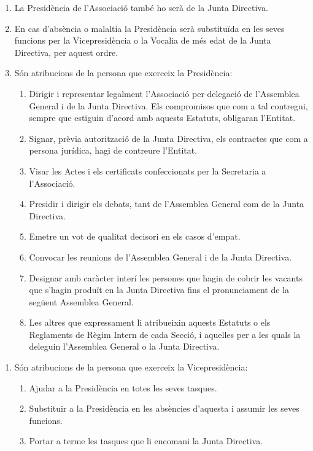 \documentclass[11pt,a4paper]{article}
\newcommand{\JD}{Junta Directiva\xspace}
\newcommand{\AG}{Assemblea General\xspace}
\DeclareRobustCommand{\RRIs}{Reglaments de Règim Intern\xspace}
\begin{document}
\begin{enumerate}
    \item La Presidència de l'Associació també ho serà de la \JD.

    \item En cas d'absència o malaltia la Presidència serà substituïda en les seves funcions per la Vicepresidència o la Vocalia de més edat de la \JD, per aquest ordre.

    \item Són atribucions de la persona que exerceix la Presidència:
    \begin{enumerate}
        \item Dirigir i representar legalment l'Associació per delegació de l'\AG i de la \JD. Els compromisos que com a tal contregui, sempre que estiguin d'acord amb aquests Estatuts, obligaran l'Entitat.
        \item Signar, prèvia autorització de la \JD, els contractes que com a persona jurídica, hagi de contreure l'Entitat.
        \item Visar les Actes i els certificats confeccionats per la Secretaria a l'Associació.
        \item Presidir i dirigir els debats, tant de l'\AG com de la \JD.
        \item Emetre un vot de qualitat decisori en els casos d'empat.
        \item Convocar les reunions de l'\AG i de la \JD.
        \item Designar amb caràcter interí les persones que hagin de cobrir les vacants que s'hagin produït en la \JD fins el pronunciament de la següent \AG. \label{presidencia:designar}
        \item Les altres que expressament li atribueixin aquests Estatuts o els \RRIs de cada Secció, i aquelles per a les quals la deleguin l'\AG o la \JD.
    \end{enumerate}
\end{enumerate}


\begin{enumerate}
    \item[] Són atribucions de la persona que exerceix la Vicepresidència:
    \begin{enumerate}
        \item Ajudar a la Presidència en totes les seves tasques.
        \item Substituir a la Presidència en les absències d'aquesta i assumir les seves funcions.
        \item Portar a terme les tasques que li encomani la \JD.
    \end{enumerate}
\end{enumerate}
\end{document}
